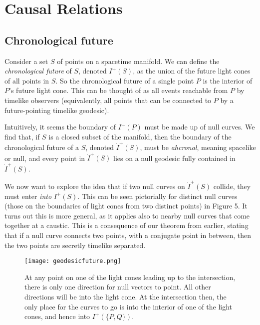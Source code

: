\documentclass[10pt]{article}
\begin{document}
            \section{Causal Relations}
            \subsection{Chronological future}
            Consider a set $S$ of points on a spacetime manifold. We can define the \textit{chronological future} of $S$, denoted $I^+(S)$, as the union of the future light cones of all points in $S$. So the chronological future of a single point $P$ is the interior of $P$'s future light cone. This can be thought of as all events reachable from $P$ by timelike observers (equivalently, all points that can be connected to $P$ by a future-pointing timelike geodesic).
            \par Intuitively, it seems the boundary of $I^+(P)$ must be made up of null curves. We find that, if $S$ is a closed subset of the manifold, then the boundary of the chronological future of a $S$, denoted $\dot{I}^+(S)$, must be \textit{ahcronal}, meaning spacelike or null, and every point in $\dot{I}^+(S)$ lies on a null geodesic fully contained in $\dot{I}^+(S)$.
            \par We now want to explore the idea that if two null curves on $\dot{I}^+(S)$ collide, they must enter \textit{into} $I^+(S)$. This can be seen pictorially for distinct null curves (those on the boundaries of light cones from two distinct points) in Figure 5. It turns out this is more general, as it applies also to nearby null curves that come together at a caustic. This is a consequence of our theorem from earlier, stating that if a null curve connects two points, with a conjugate point in between, then the two points are secretly timelike separated.
            
            \begin{figure}[!h]
                \centering
                \texttt{[image: geodesicfuture.png]}
                \caption{At any point on one of the light cones leading up to the intersection, there is only one direction for null vectors to point. All other directions will be into the light cone. At the intersection then, the only place for the curves to go is into the interior of one of the light cones, and hence into $I^+(\{P,Q\})$.}
                \label{fig:my_label}
            \end{figure}
            
\end{document}
